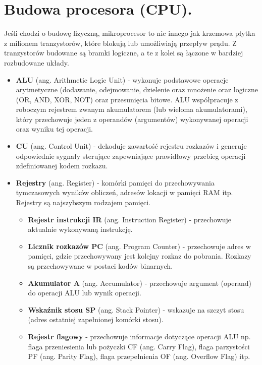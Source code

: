 \documentclass[12pt,a4paper]{article}
\begin{document}
	\section{Budowa procesora (CPU).}
	Jeśli chodzi o budowę fizyczną, mikroprocesor to nic innego jak krzemowa płytka z milionem tranzystorów, które blokują lub umożliwiają przepływ prądu. Z tranzystorów budowane są bramki logiczne, a te z kolei są łączone w bardziej rozbudowane układy.
	
	\begin{itemize}
		\item \textbf{ALU} (ang. Arithmetic Logic Unit) - wykonuje podstawowe operacje arytmetyczne (dodawanie, odejmowanie, dzielenie oraz mnożenie oraz logiczne (OR, AND, XOR, NOT) oraz przesunięcia bitowe. ALU współpracuje z roboczym rejestrem zwanym akumulatorem (lub wieloma akumulatorami), który przechowuje jeden z operandów (argumentów) wykonywanej operacji oraz wyniku tej operacji.
		
		\item \textbf{CU} (ang. Control Unit) - dekoduje zawartość rejestru rozkazów i generuje odpowiednie sygnały sterujące zapewniające prawidłowy przebieg operacji zdefiniowanej kodem rozkazu.
		
		\item \textbf{Rejestry} (ang. Register) - komórki pamięci do przechowywania tymczasowych wyników obliczeń, adresów lokacji w pamięci RAM itp. Rejestry są najszybszym rodzajem pamięci.
		\begin{itemize}
			\item \textbf{Rejestr instrukcji IR} (ang. Instruction Register) - przechowuje aktualnie wykonywaną instrukcję.
			\item\textbf{ Licznik rozkazów PC} (ang. Program Counter) - przechowuje adres w pamięci, gdzie przechowywany jest kolejny rozkaz do pobrania. Rozkazy są przechowywane w postaci kodów binarnych.
			\item \textbf{Akumulator A} (ang. Accumulator) - przechowuje argument (operand) do operacji ALU lub wynik operacji.
			\item \textbf{Wskaźnik stosu SP} (ang. Stack Pointer) - wskazuje na szczyt stosu (adres ostatniej zapełnionej komórki stosu).
			\item \textbf{Rejestr flagowy} - przechowuje informacje dotyczące operacji ALU np. flaga przeniesienia lub pożyczki CF (ang. Carry Flag), flaga parzystości PF (ang. Parity Flag), flaga przepełnienia OF (ang. Overflow Flag) itp.
		\end{itemize}
		

\end{itemize}
\end{document}

